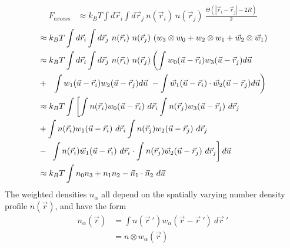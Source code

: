 \documentclass[double,12pt]{beavtex}
\begin{document}
\begin{align}      
     F_{excess} &\approx k_BT\int d\vec r_i \int d\vec r_j~n(\vec r_i)~n(\vec r_j)~\frac{\Theta(|\vec r_i-\vec r_j|-2R)}{2}                                                              
\end{align} 
\begin{align} 
                &\approx k_BT\int d\vec r_i \int d\vec r_j~n(\vec r_i)~n(\vec r_j)~(w_3\otimes w_0+ w_2 \otimes w_1+\vec {w}_2\otimes \vec {w}_1)  \\
                &\approx k_BT\int d\vec r_i \int d\vec r_j~n(\vec r_i)~n(\vec r_j)\left(\int w_0(\vec u - \vec r_i)w_3(\vec u - \vec r_j) d\vec u \color{white}\right)  \nonumber \\
                &+ \color{white}\left(\color{black}\int w_1(\vec u - \vec r_i)w_2(\vec u - \vec r_j) d\vec u ~-\int \vec {w}_1(\vec u - \vec r_i)\cdot\vec {w}_2(\vec u - \vec r_j) d\vec u\right)  \\  
                &\approx k_BT\int \left[\int n(\vec r_i) w_0(\vec u - \vec r_i)~d\vec r_i \int n(\vec r_j) w_3(\vec u - \vec r_j)~d\vec r_j \color{white}\right]  \nonumber \\
                &+ \int n(\vec r_i) w_1(\vec u - \vec r_i)~d\vec r_i \int n(\vec r_j) w_2(\vec u - \vec r_j)~d\vec r_j  \nonumber \\
                &- \color{white}\left[\color{black} \int n(\vec r_i) \vec {w}_1(\vec u - \vec r_i)~d\vec r_i \cdot \int n(\vec r_j) \vec {w}_2(\vec u - \vec r_j)~d\vec r_j \right]\color{black}d\vec u  \\              
                &\approx k_BT\int n_0n_3 + n_1n_2 - \vec n_1\cdot\vec n_2~d\vec u  \label{Fexlowden-inhomo}                  
\end{align}
The weighted densities $n_\alpha$ all depend on the spatially varying 
number density profile $n(\vec r)$, and have the form
\begin{align}
    n_\alpha(\vec r) &= \int n(\vec {r}~')w_\alpha(\vec r-\vec {r}~')~d\vec {r}~'  \label{weighted_densities}  \\
                     &= n\otimes w_\alpha(\vec r)
\end{align}  
\end{document}
